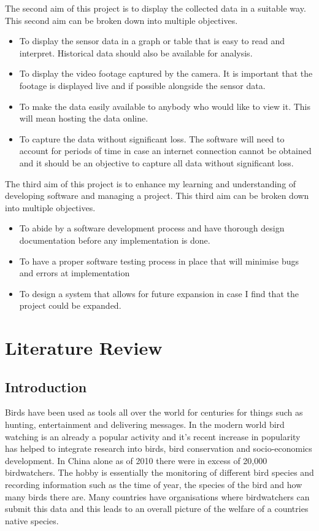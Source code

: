 \documentclass[10pt,a4paper]{article}
\begin{document}
The second aim of this project is to display the collected data in a suitable way. This second aim can be broken down into multiple objectives.
\begin{itemize}
\item To display the sensor data in a graph or table that is easy to read and interpret. Historical data should also be available for analysis. 

\item To display the video footage captured by the camera. It is important that the footage is displayed live and if possible alongside the sensor data. 

\item To make the data easily available to anybody who would like to view it. This will mean hosting the data online. 

\item To capture the data without significant loss. The software will need to account for periods of time in case an internet connection cannot be obtained and it should be an objective to capture all data without significant loss. 
\end{itemize}

The third aim of this project is to enhance my learning and understanding of developing software and managing a project. This third aim can be broken down into multiple objectives. 
\begin{itemize}
\item To abide by a software development process and have thorough design documentation before any implementation is done. 

\item To have a proper software testing process in place that will minimise bugs and errors at implementation

\item To design a system that allows for future expansion in case I find that the project could be expanded. 
\end{itemize}

\pagebreak
\section{Literature Review}
\subsection{Introduction}
Birds have been used as tools all over the world for centuries for things such as hunting, entertainment and delivering messages. In the modern world bird watching is an already a popular activity and it's recent increase in popularity has helped to integrate research into birds, bird conservation and socio-economics development\cite{Zhijun2013}. In China alone as of 2010 there were in excess of 20,000 birdwatchers\cite{Zhijun2013}. The hobby is essentially the monitoring of different bird species and recording information such as the time of year, the species of the bird and how many birds there are. Many countries have organisations where birdwatchers can submit this data and this leads to an overall picture of the welfare of a countries native species.
\end{document}
